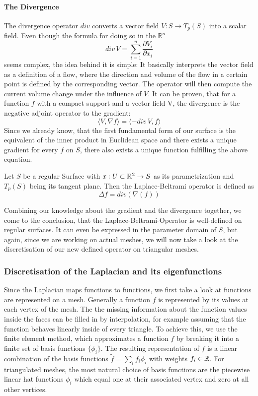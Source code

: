 \paragraph{The Divergence}
The divergence operator $div$ converts a vector field $V: S \rightarrow T_p(S)$ into a scalar field.
Even though the formula for doing so in the $\mathbb{R}^n$
\begin{equation}
	div\, V = \sum_{i=1}^{n} \frac{\partial V_i}{\partial x_i}
\end{equation}
seems complex, the idea behind it is simple:
It basically interprets the vector field as a definition of a flow, where the direction and volume of the flow in a certain point is defined by the corresponding vector.
The operator will then compute the current volume change under the influence of $V$.
It can be proven, that for a function $f$ with a compact support and a vector field V, the divergence is the negative adjoint operator to the gradient:\cite{polymesh}
\begin{equation}
	\langle V, \nabla f \rangle = \langle -div\, V, f \rangle
\end{equation}
Since we already know, that the first fundamental form of our surface is the equivalent of the inner product in Euclidean space and there exists a unique gradient for every $f$ on $S$, there also exists a unique function fulfilling the above equation.

\begin{mydef}
	Let $S$ be a regular Surface with $x:U\subset\mathbb{R}^2 \rightarrow S$ as its parametrization and $T_p(S)$ being its tangent plane.
	Then the Laplace-Beltrami operator is defined as
	$$\Delta f = div(\nabla(f))$$
\end{mydef}
Combining our knowledge about the gradient and the divergence together, we come to the conclusion, that the Laplace-Beltrami-Operator is well-defined on regular surfaces.
It can even be expressed in the parameter domain of $S$, but again, since we are working on actual meshes, we will now take a look at the discretisation of our new defined operator on triangular meshes.

\subsubsection{Discretisation of the Laplacian and its eigenfunctions}
Since the Laplacian maps functions to functions, we first take a look at functions are represented on a mesh.
Generally a function $f$ is represented by its values at each vertex of the mesh.
The the missing information about the function values inside the faces can be filled in by interpolation, for example assuming that the function behaves linearly inside of every triangle.
To achieve this, we use the finite element method, which approximates a function $f$ by breaking it into a finite set of basis functions $\{\phi_i\}$.
The resulting representation of $f$ is a linear combination of the basis functions $\tilde{f} = \sum_i f_i \phi_i$ with weights $f_i \in \mathbb{R}$.
For triangulated meshes, the most natural choice of basis functions are the piecewise linear hat functions $\phi_i$ which equal one at their associated vertex and zero at all other vertices.

